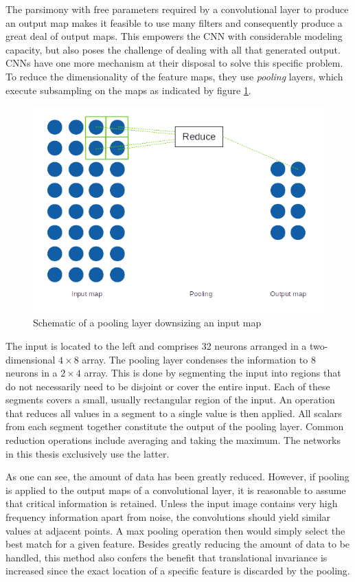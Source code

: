 \documentclass[11pt, a4paper]{article}
\begin{document}
The parsimony with free parameters required by a convolutional layer to produce an output map makes it feasible to use many filters and consequently produce a great deal of output maps. This empowers the CNN with considerable modeling capacity, but also poses the challenge of dealing with all that generated output. CNNs have one more mechanism at their disposal to solve this specific problem. To reduce the dimensionality of the feature maps, they use \emph{pooling} layers, which execute subsampling on the maps as indicated by figure \ref{fig:pooling-layer}.

\begin{figure}[h!tb]
	\centering
	\includegraphics[scale=1.00]{images/pooling_layer.png}
	\caption[Pooling layer functionality]{Schematic of a pooling layer downsizing an input map}
	\label{fig:pooling-layer}
\end{figure}

The input is located to the left and comprises 32 neurons arranged in a two-dimensional $4 \times 8$ array. The pooling layer condenses the information to 8 neurons in a $2 \times 4$ array. This is done by segmenting the input into regions that do not necessarily need to be disjoint or cover the entire input. Each of these segments covers a small, usually rectangular region of the input. An operation that reduces all values in a segment to a single value is then applied. All scalars from each segment together constitute the output of the pooling layer. Common reduction operations include averaging and taking the maximum. The networks in this thesis exclusively use the latter.

As one can see, the amount of data has been greatly reduced. However, if pooling is applied to the output maps of a convolutional layer, it is reasonable to assume that critical information is retained. Unless the input image contains very high frequency information apart from noise, the convolutions should yield similar values at adjacent points. A max pooling operation then would simply select the best match for a given feature. Besides greatly reducing the amount of data to be handled, this method also confers the benefit that translational invariance is increased since the exact location of a specific feature is discarded by the pooling.
\end{document}
